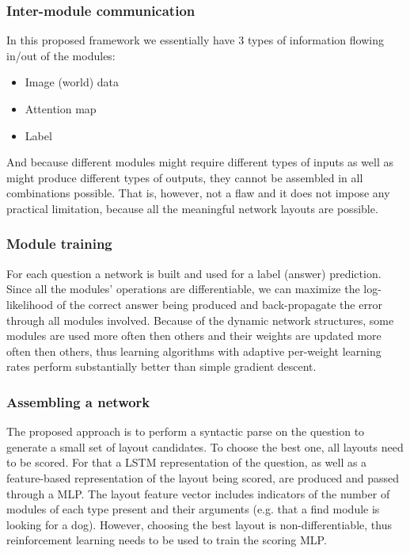 \documentclass[a4paper,twocolumn]{article}
\begin{document}
\subsubsection*{Inter-module communication}
In this proposed framework we essentially have 3 types of information flowing in/out of the modules:
    \begin{itemize}
        \item Image (world) data
        \item Attention map
        \item Label
    \end{itemize}
And because different modules might require different types of inputs as well as might produce different types of outputs, they cannot be assembled in all combinations possible. That is, however, not a flaw and it does not impose any practical limitation, because all the meaningful network layouts are possible.

\subsubsection*{Module training}
For each question a network is built and used for a label (answer) prediction.  Since all the modules' operations are differentiable, we can maximize the log-likelihood of the correct answer being produced and back-propagate the error through all modules involved. Because of the dynamic network structures, some modules are used more often then others and their weights are updated more often then others, thus learning algorithms with adaptive per-weight learning rates perform substantially better than simple gradient descent.

\subsubsection*{Assembling a network}
    The proposed approach is to perform a syntactic parse on the question to generate a small set of layout candidates. To choose the best one, all layouts need to be scored. For that a LSTM representation of the question, as well as a feature-based representation of the layout being scored, are produced and passed through a MLP. The layout feature vector includes indicators of the number of modules of each type present and their arguments (e.g. that a find module is looking for a dog).
 However, choosing the best layout is non-differentiable, thus reinforcement learning needs to be used to train the scoring MLP.
\end{document}
